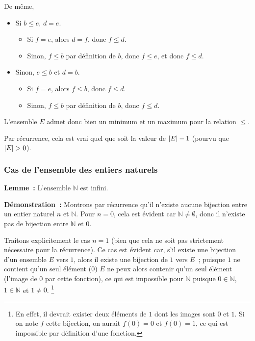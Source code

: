     De même, 
    \begin{itemize}[nosep]
        \item Si $b \leq e$, $d = e$.
            \begin{itemize}[nosep]
                \item Si $f = e$, alors $d = f$, donc $f \leq d$.
                \item Sinon, $f \leq b$ par définition de $b$, donc $f \leq e$, et donc $f \leq d$.
            \end{itemize}
        \item Sinon, $e \leq b$ et $d = b$.
            \begin{itemize}[nosep]
                \item Si $f = e$, alors $f \leq b$, donc $f \leq d$.
                \item Sinon, $f \leq b$ par définition de $b$, donc $f \leq d$.
            \end{itemize}
    \end{itemize}
    L'ensemble $E$ admet donc bien un minimum et un maximum pour la relation $\leq$.

    Par récurrence, cela est vrai quel que soit la valeur de $\left\lvert E \right\rvert-1$ (pourvu que $\left\lvert E \right\rvert > 0$).

    \done

\subsubsection{Cas de l'ensemble des entiers naturels}

\noindent\textbf{Lemme :} L'ensemble $\mathbb{N}$ est infini. 

\medskip

\noindent\textbf{Démonstration :} Montrons par récurrence qu'il n'existe aucune bijection entre un entier naturel $n$ et $\mathbb{N}$. 
    Pour $n=0$, cela est évident car $\mathbb{N} \neq \emptyset$, donc il n'existe pas de bijection entre $\mathbb{N}$ et $0$.
    
    Traitons explicitement le cas $n=1$ (bien que cela ne soit pas strictement nécessaire pour la récurrence). 
    Ce cas est évident car, s'il existe une bijection d'un ensemble $E$ vers $1$, alors il existe une bijection de $1$ vers $E$ ; puisque $1$ ne contient qu'un seul élément ($0$) $E$ ne peux alors contenir qu'un seul élément (l'image de $0$ par cette fonction), ce qui est impossible pour $\mathbb{N}$ puisque $0 \in \mathbb{N}$, $1 \in \mathbb{N}$ et $1 \neq 0$.%
    \footnote{
        En effet, il devrait exister deux éléments de $1$ dont les images sont $0$ et $1$. 
        Si on note $f$ cette bijection, on aurait $f(0) = 0$ et $f(0) = 1$, ce qui est impossible par définition d'une fonction.
    }

